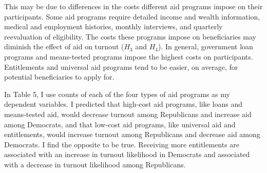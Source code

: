 \documentclass[12pt]{paper}
\begin{document}
This may be due to differences in the costs different aid programs impose on their participants. Some aid programs require detailed income and wealth information, medical and employment histories, monthly interviews, and quarterly reevaluation of eligibility. The costs these programs impose on beneficiaries may diminish the effect of aid on turnout ($H_3$ and $H_4$). In general, government loan programs and means-tested programs impose the highest costs on participants. Entitlements and universal aid programs tend to be easier, on average, for potential beneficiaries to apply for.

In Table 5, I use counts of each of the four types of aid programs as my dependent variables. I predicted that high-cost aid programs, like loans and means-tested aid, would decrease turnout among Republicans and increase aid among Democrats, and that low-cost aid programs, like universal aid and entitlements, would increase turnout among Republicans and decrease aid among Democrats. I find the opposite to be true. Receiving more entitlements are associated with an increase in turnout likelihood in Democrats and associated with a decrease in turnout likelihood among Republicans.
\end{document}
